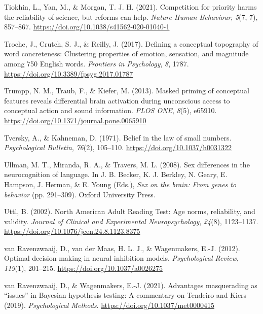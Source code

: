 \documentclass[
  12pt,
  man,floatsintext]{apa7}
\newlength{\cslhangindent}
\newlength{\cslentryspacingunit} %
\newenvironment{CSLReferences}[2] %
 {%
  \setlength{\parindent}{0pt}
  \ifodd #1
  \let\oldpar\par
  \def\par{\hangindent=\cslhangindent\oldpar}
  \fi
  \setlength{\parskip}{#2\cslentryspacingunit}
 }%
 {}
\begin{document}
\begin{CSLReferences}{1}{0}
\leavevmode{}%
Tiokhin, L., Yan, M., \& Morgan, T. J. H. (2021). Competition for priority harms the reliability of science, but reforms can help. \emph{Nature Human Behaviour}, \emph{5}(7, 7), 857--867. \url{https://doi.org/10.1038/s41562-020-01040-1}

\leavevmode{}%
Troche, J., Crutch, S. J., \& Reilly, J. (2017). Defining a conceptual topography of word concreteness: {Clustering} properties of emotion, sensation, and magnitude among 750 {English} words. \emph{Frontiers in Psychology}, \emph{8}, 1787. \url{https://doi.org/10.3389/fpsyg.2017.01787}

\leavevmode{}%
Trumpp, N. M., Traub, F., \& Kiefer, M. (2013). Masked priming of conceptual features reveals differential brain activation during unconscious access to conceptual action and sound information. \emph{PLOS ONE}, \emph{8}(5), e65910. \url{https://doi.org/10.1371/journal.pone.0065910}

\leavevmode{}%
Tversky, A., \& Kahneman, D. (1971). Belief in the law of small numbers. \emph{Psychological Bulletin}, \emph{76}(2), 105--110. \url{https://doi.org/10.1037/h0031322}

\leavevmode{}%
Ullman, M. T., Miranda, R. A., \& Travers, M. L. (2008). Sex differences in the neurocognition of language. In J. B. Becker, K. J. Berkley, N. Geary, E. Hampson, J. Herman, \& E. Young (Eds.), \emph{Sex on the brain: {From} genes to behavior} (pp. 291--309). {Oxford University Press}.

\leavevmode{}%
Uttl, B. (2002). North {American Adult Reading Test}: {Age} norms, reliability, and validity. \emph{Journal of Clinical and Experimental Neuropsychology}, \emph{24}(8), 1123--1137. \url{https://doi.org/10.1076/jcen.24.8.1123.8375}

\leavevmode{}%
van Ravenzwaaij, D., van der Maas, H. L. J., \& Wagenmakers, E.-J. (2012). Optimal decision making in neural inhibition models. \emph{Psychological Review}, \emph{119}(1), 201--215. \url{https://doi.org/10.1037/a0026275}

\leavevmode{}%
van Ravenzwaaij, D., \& Wagenmakers, E.-J. (2021). Advantages masquerading as {``issues''} in {Bayesian} hypothesis testing: {A} commentary on {Tendeiro} and {Kiers} (2019). \emph{Psychological Methods}. \url{https://doi.org/10.1037/met0000415}


\end{CSLReferences}
\end{document}
